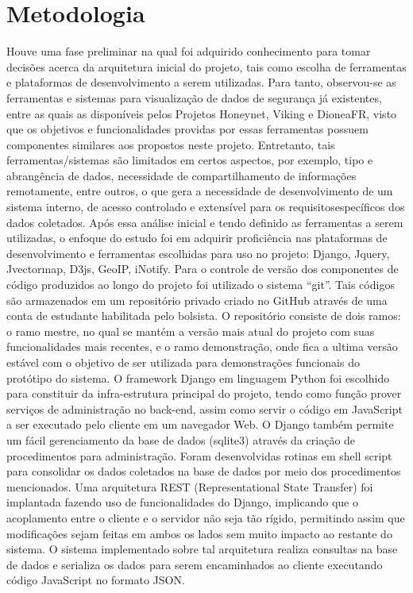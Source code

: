 \documentclass[%
        Portuguese,%
        ]
{ic-tese-v2}
\begin{document}
\chapter{Metodologia}
Houve uma fase preliminar na qual foi adquirido conhecimento para tomar decisões acerca da arquitetura inicial do projeto, tais como escolha de ferramentas e plataformas de desenvolvimento a serem utilizadas.
Para tanto, observou-se as ferramentas e sistemas para visualização de dados de segurança já existentes, entre as quais as disponíveis pelos Projetos Honeynet, Viking e DioneaFR, visto que os objetivos e funcionalidades providas por essas ferramentas possuem componentes similares aos propostos neste projeto. Entretanto, tais ferramentas/sistemas são limitados em certos aspectos, por exemplo, tipo e abrangência de dados, necessidade de compartilhamento de informações remotamente, entre outros, o que gera a necessidade de desenvolvimento de um sistema interno, de acesso controlado e extensível para os requisitosespecíficos dos dados coletados.
Após essa análise inicial e tendo definido as ferramentas a serem utilizadas, o enfoque do estudo foi em adquirir proficiência nas plataformas de desenvolvimento e ferramentas escolhidas para uso no projeto: Django, Jquery, Jvectormap, D3js, GeoIP, iNotify.
Para o controle de versão dos componentes de código produzidos ao longo do projeto foi utilizado o sistema “git”. Tais códigos são armazenados em um repositório privado criado no GitHub através de uma conta de estudante habilitada pelo bolsista. O repositório consiste de dois ramos: o ramo mestre, no qual se mantém a versão mais atual do projeto com suas funcionalidades mais recentes, e o ramo demonstração, onde fica a ultima versão estável com o objetivo de ser utilizada para demonstrações funcionais do protótipo do sistema.
O framework Django em linguagem Python foi escolhido para constituir da infra-estrutura principal do projeto, tendo como função prover serviços de administração no back-end, assim como servir o código em JavaScript a ser executado pelo cliente em um navegador Web. O Django também permite um fácil gerenciamento da base de dados (sqlite3) através da criação de procedimentos para administração. Foram desenvolvidas rotinas em shell script para consolidar os dados coletados na base de dados por meio dos procedimentos mencionados.
Uma arquitetura REST (Representational State Transfer) foi implantada fazendo uso de funcionalidades do Django, implicando que o acoplamento entre o cliente e o servidor não seja tão rígido, permitindo assim que modificações sejam feitas em ambos os lados sem muito impacto ao restante do sistema. O sistema implementado sobre tal arquitetura realiza consultas na base de dados e serializa os dados para serem encaminhados ao cliente executando código JavaScript no formato JSON.
\end{document}
